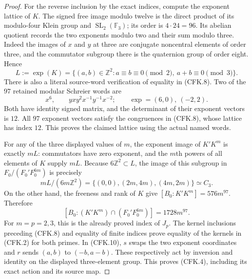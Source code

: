 \begin{proof}
For the reverse inclusion by the exact indices, compute the exponent
lattice of $K$.  The signed free image modulo twelve is the direct
product of its modulo-four Klein group and
$\operatorname{SL}_2(\mathbb F_3)$; its order is $4\cdot24=96$.
Its abelian quotient records the two exponents modulo two and their
sum modulo three.  Indeed the images of $x$ and $y$ at three are
conjugate noncentral elements of order three, and the commutator
subgroup there is the quaternion group of order eight.  Hence
\[
 L:=\operatorname{exp}(K)
     =\{(a,b)\in\mathbb Z^2:
              a\equiv b\equiv0\pmod2,\ a+b\equiv0\pmod3\}.
                                                               \tag{CFK.8}
\]
There is also a literal source-word verification of equality in
(CFK.8).  Two of the $97$ retained modular Schreier words are
\[
 x^6,\qquad yxy^2x^{-1}y^{-1}x^{-2};
 \qquad\operatorname{exp}=(6,0),\ (-2,2).
                                                               \tag{CFK.9}
\]
Both have identity signed matrix, and the determinant of their
exponent vectors is $12$.  All $97$ exponent vectors satisfy the
congruences in (CFK.8), whose lattice has index $12$.  This proves
the claimed lattice using the actual named words.

For any of the three displayed values of $m$, the exponent image of
$K'K^m$ is exactly $mL$: commutators have zero exponent, and the
$m$th powers of all elements of $K$ supply $mL$.  Because
$6\mathbb Z^2\subset L$, the image of this subgroup in
$F_0/(F_0'F_0^{6m})$ is precisely
\[
       mL/(6m\mathbb Z^2)
       =\{(0,0),(2m,4m),(4m,2m)\}\simeq C_3.
                                                               \tag{CFK.10}
\]
On the other hand, the freeness and rank of $K$ give
$[B_0:K'K^m]=576m^{97}$.  Therefore
\[
 [B_0:(K'K^m)\cap(F_0'F_0^{6m})]
                         =1728m^{97}.
                                                               \tag{CFK.11}
\]
For $m=p=2,3$, this is the already proved index of $J_p$.
The kernel inclusions preceding (CFK.8) and equality of finite indices
prove equality of the kernels in (CFK.2) for both primes.
In (CFK.10), $s$ swaps the two exponent coordinates and $r$ sends
$(a,b)$ to $(-b,a-b)$.  These respectively act by inversion and
identity on the displayed three-element group.  This proves
(CFK.4), including its exact action and its source map.


\end{proof}
